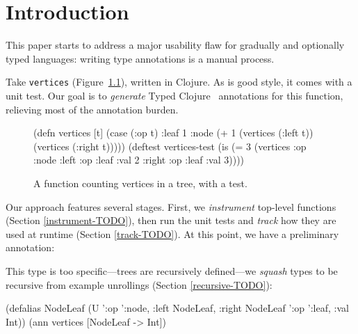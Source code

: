 \chapter{Introduction}


This paper starts to address a major usability flaw
for gradually and optionally typed languages:
writing type annotations is a manual process.

Take \texttt{vertices} (Figure~\ref{vertices}),
written in Clojure.
As is good style, it comes with a unit test.
Our goal is to \textit{generate} Typed Clojure~\cite{bonnaire2016practical}
annotations
for this function, relieving most of the annotation
burden.

\begin{figure}
\begin{cljlisting}
(defn vertices [t]
  (case (:op t)
    :leaf 1
    :node (+ 1 (vertices (:left t))
               (vertices (:right t)))))
(deftest vertices-test
  (is (= 3 (vertices {:op :node 
                      :left {:op :leaf :val 2}
                      :right {:op :leaf :val 3}}))))
\end{cljlisting}
\caption{A function counting vertices in a tree,
with a test.}
\label{vertices}
\end{figure}

Our approach features several stages.
First, we \textit{instrument} top-level functions
(Section \ref{instrument-TODO}),
then run the unit tests and \textit{track}
how they are used at runtime
(Section \ref{track-TODO}).
At this point, we have a preliminary
annotation:

\begin{cljlisting}
(ann vertices ['{:op ':node,
                 :left '{:op ':leaf,
                         :val Int},
                 :right '{:op ':leaf,
                          :val Int}}
               -> Int]})
\end{cljlisting}

This type is too specific---trees are recursively
defined---we \textit{squash} types to be
recursive from example unrollings (Section \ref{recursive-TODO}):

\begin{cljlisting}
(defalias NodeLeaf 
  (U '{:op ':node, :left NodeLeaf, :right NodeLeaf}
     '{:op ':leaf, :val Int}))
(ann vertices [NodeLeaf -> Int])
\end{cljlisting}


